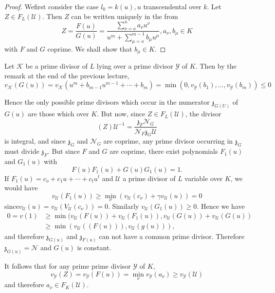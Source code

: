 \begin{proof}
  We\pageoriginale first consider the case $l_0 = k (u), u$ transcendental over
  $k$. Let $Z \in F_L (\mathscr{U})$. Then $Z$ can be written
  uniquely in the from 
  $$
  Z = \frac{F(u)}{G(u)} = \frac{\sum\limits^n _{\nu=o} a_\nu
    u^\nu}{u^m +\sum\limits_{\mu=o}^{m-1} b_\mu u^\mu}, a_\nu, b_\mu
  \in K 
  $$
  with $F$ and $G$ coprime. We shall show that $b_\mu \in K$.
\end{proof}

Let $\mathscr{K}$ be a prime divisor of $L$ lying over a prime divisor
$\mathscr{Y}$ of $K$. Then by the remark at the end of the previous
lecture, 
{\fontsize{10pt}{12pt}\selectfont
$$
v_\mathscr{K} (G (u)) = v_\mathscr{K} (u^m + b_{m-1} u^{m-1} +\cdots+
b_m) = \min (0, v_\mathscr{Y} (b_1) ,\ldots, v_\mathscr{Y} (b_m)) \le
0 
$$}\relax

Hence the only possible prime divisors which occur in the numerator
$\mathfrak{z}_{G (U)}$ of $G(u)$ are those which over $K$. But now,
since $Z \in F_L (\mathscr{U})$, the divisor  
$$
(Z) \mathscr{U}^{-1} = \frac{\mathfrak{z}_F
  \mathscr{N}_G}{\mathscr{N}_F \mathfrak{z}_G \mathscr{U}} 
$$
is integral, and since $\mathfrak{z}_G$ and $\mathscr{N}_G$ are
coprime, any prime divisor occurring in $\mathfrak{z}_G$ must divide
$\mathfrak{z}_F$. But since $F $ and $G$ are coprime, there exist
polynomials $F_1 (u)$ and $G_1 (u)$ with 
$$
F (u) F_1 (u) + G (u) G_1 (u) = 1.
$$
If $F_1 (u) = c_o + c_1 u +\cdots+c_t u^t $ and $\mathscr{U}$ a prime
divisor of $L$ variable over $K$, we would have  
$$
v_\mathscr{U} (F_1 (u)) \ge \min_\nu (v_\mathscr{U} (c_\nu) + \gamma
v_\mathscr{U} (u)) =0 
$$
since\pageoriginale $v_\mathscr{U} (u) = v_\mathscr{U} (V_\mathscr{U} (c_\nu)) =
0$. Similarly $v_\mathscr{U} (G_1 (u)) \ge 0$. Hence we have  
\begin{align*}
  0= v (1) & \ge \min (v_\mathscr{U} (F (u)) + v_\mathscr{U} (F_1(u)),
  v_\mathscr{U} (G (u)) +v_\mathscr{U} (G (u))\\ 
  & \ge \min (v_\mathscr{U} ((F (u))), v_\mathscr{U} (g (u))),
\end{align*}
and therefore $\mathfrak{z}_{G (u)}$ and $\mathfrak{z}_{F (u)}$ can
not have a common prime divisor. Therefore $\mathfrak{z}_{G (u)} =
\mathscr{N}$ and $G(u)$ is constant. 

It follows that for any prime prime divisor $\mathscr{Y}$ of $K$,
$$
v_\mathscr{Y} (Z) = v_\mathscr{Y} (F (u)) = \min_\nu v_\mathscr{Y}
(a_\nu) \ge v_\mathscr{Y} (\mathscr{U}) 
$$
and therefore $a_\nu \in F_K (\mathscr{U})$.

